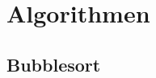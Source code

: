 \documentclass[./entry.tex]{subfiles}
\begin{document}
    \section{Algorithmen}
    \subsection{Bubblesort}
    
\end{document}
